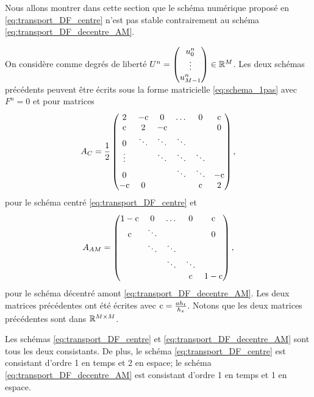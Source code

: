 \documentclass[12pt,a4paper,twoside]{article}
\begin{document}
Nous allons montrer dans cette section que le sch\'ema num\'erique 
propos\'e en \eqref{eq:transport_DF_centre} n'est pas stable
contrairement au sch\'ema \eqref{eq:transport_DF_decentre_AM}.

On consid\`ere comme degr\'es de libert\'e
$U^n = 
\begin{pmatrix}
  u_0^n \\ \vdots \\ u_{M-1}^n
\end{pmatrix}
\in \mathbb{R}^M
$.
Les deux sch\'emas pr\'ec\'edents peuvent \^etre \'ecrits sous la forme matricielle 
\eqref{eq:schema_1pas} avec $F^n = 0$ et pour matrices
\begin{align}
  A_{C} = \dfrac{1}{2}
  \begin{pmatrix}
    2 & -\mathrm{c} & 0 & \dots & 0 & \mathrm{c}
    \\
    \mathrm{c} & 2 & -\mathrm{c} & & & 0
    \\
    0 & \ddots & \ddots & \ddots & &
    \\
    \vdots & & \ddots & \ddots & \ddots
    \\
    0 & & & \ddots & \ddots & -\mathrm{c}
    \\
    -\mathrm{c} & 0 & & & \mathrm{c} & 2
  \end{pmatrix},
\end{align}
pour le sch\'ema centr\'e \eqref{eq:transport_DF_centre}
et
\begin{align}
  A_{AM} = 
  \begin{pmatrix}
    1-\mathrm{c} & 0 & \dots & 0 & \mathrm{c}
    \\
    \mathrm{c} & \ddots & & & 0
    \\
    & \ddots & \ddots &   &
    \\
    & & \ddots & \ddots &
    \\
    &&   &  \mathrm{c} & 1-\mathrm{c}
  \end{pmatrix},
\end{align}
pour le sch\'ema d\'ecentr\'e amont \eqref{eq:transport_DF_decentre_AM}.
Les deux matrices pr\'ec\'edentes ont \'et\'e \'ecrites avec 
$\mathrm{c} = \frac{a h_t}{h_x}$.
Notons que les deux matrices pr\'ec\'edentes sont dans
$\mathbb{R}^{M \times M}$.

\begin{proposition}
  Les sch\'emas \eqref{eq:transport_DF_centre} et \eqref{eq:transport_DF_decentre_AM}
  sont tous les deux consistants.
  De plus, le sch\'ema \eqref{eq:transport_DF_centre} est consistant d'ordre 1
  en temps et 2 en espace;
  le sch\'ema \eqref{eq:transport_DF_decentre_AM} est consistant d'ordre 1
  en temps et 1 en espace.
\end{proposition}
\end{document}
